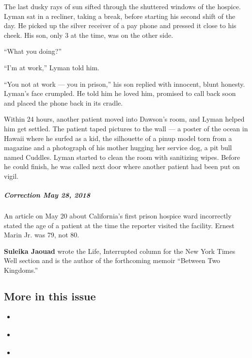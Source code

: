 The last dusky rays of sun sifted through the shuttered windows of the
hospice. Lyman sat in a recliner, taking a break, before starting his
second shift of the day. He picked up the silver receiver of a pay phone
and pressed it close to his cheek. His son, only 3 at the time, was on
the other side.

``What you doing?''

``I'm at work,'' Lyman told him.

``You not at work --- you in prison,'' his son replied with innocent,
blunt honesty. Lyman's face crumpled. He told him he loved him, promised
to call back soon and placed the phone back in its cradle.

Within 24 hours, another patient moved into Dawson's room, and Lyman
helped him get settled. The patient taped pictures to the wall --- a
poster of the ocean in Hawaii where he surfed as a kid, the silhouette
of a pinup model torn from a magazine and a photograph of his mother
hugging her service dog, a pit bull named Cuddles. Lyman started to
clean the room with sanitizing wipes. Before he could finish, he was
called next door where another patient had been put on vigil.

\hypertarget{correction-may-28-2018}{%
\subparagraph{\texorpdfstring{\textbf{Correction} May 28,
2018}{Correction May 28, 2018}}\label{correction-may-28-2018}}

An article on May 20 about California's first prison hospice ward
incorrectly stated the age of a patient at the time the reporter visited
the facility. Ernest Marin Jr. was 79, not 80.

\textbf{Suleika Jaouad} wrote the Life, Interrupted column for the New
York Times Well section and is the author of the forthcoming memoir
``Between Two Kingdoms.''

\hypertarget{more-in-this-issue}{%
\subsection{More in this issue}\label{more-in-this-issue}}

\begin{itemize}
\tightlist
\item
  \href{https://www.nytimes3xbfgragh.onion/interactive/2018/05/15/magazine/health-issue-my-adventures-with-hallucinogenic-drugs-medicine.html?action=click\&module=MagazineModule\&pgtype=Article\&contentCollection=Magazine\&region=Footer}{}
\item
  \href{https://www.nytimes3xbfgragh.onion/interactive/2018/05/16/magazine/health-issue-what-we-lose-with-data-driven-medicine.html?action=click\&module=MagazineModule\&pgtype=Article\&contentCollection=Magazine\&region=Footer}{}
\item
  \href{https://www.nytimes3xbfgragh.onion/interactive/2018/05/16/magazine/health-issue-reinvention-of-primary-care-delivery.html?action=click\&module=MagazineModule\&pgtype=Article\&contentCollection=Magazine\&region=Footer}{}
\end{itemize}

